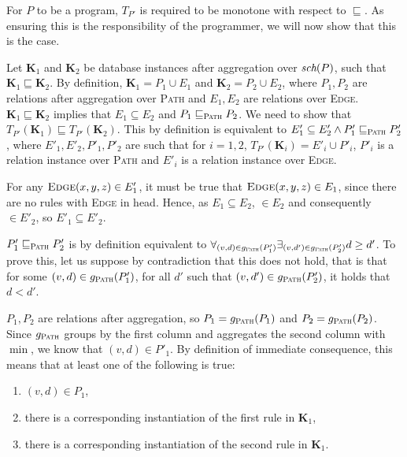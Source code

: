 \begin{exmp}
For $P$ to be a \datalogra program, $T_{P'}$ is required to be monotone with respect to $\sqsubseteq$. As ensuring this is the responsibility of the programmer, we will now show that this is the case.

\begin{prof}
Let \textbf{K}$_1$ and \textbf{K}$_2$ be database instances after aggregation over $\textit{sch}(P)$, such that $\textbf{K}_1 \sqsubseteq \textbf{K}_2$. By definition, $\textbf{K}_1 = P_1 \cup E_1$ and $\textbf{K}_2 = P_2 \cup E_2$, where $P_1, P_2$ are relations after aggregation over \textsc{Path} and $E_1, E_2$ are relations over \textsc{Edge}.  $\textbf{K}_1 \sqsubseteq \textbf{K}_2$ implies that $E_1 \subseteq E_2$ and $P_1 \sqsubseteq_\textsc{Path} P_2$. We need to show that $T_{P'}(\textbf{K}_1) \sqsubseteq T_{P'}(\textbf{K}_2)$. This by definition is equivalent to $E'_1 \subseteq E'_2 \wedge P'_1 \sqsubseteq_\textsc{Path} P'_2$, where $E'_1, E'_2, P'_1, P'_2$ are such that for $i = 1, 2$, $T_{P'}(\textbf{K}_i) = E'_i \cup P'_i$, $P'_i$ is a relation instance over \textsc{Path} and $E'_i$ is a relation instance over \textsc{Edge}.

For any $\textsc{Edge}{(x, y, z)} \in E'_1$, it must be true that $\textsc{Edge}{(x, y, z)} \in E_1$, since there are no rules with \textsc{Edge} in head. Hence, as $E_1 \subseteq E_2$, $ \in E_2$ and consequently $ \in E'_2$, so $E'_1 \subseteq E'_2$.

$P'_1 \sqsubseteq_\textsc{Path} P'_2$ is by definition equivalent to $\forall_{(v, d) \in g_\textsc{Path}(P'_1)} \exists_{(v, d') \in g_\textsc{Path}(P'_2)} d \ge d' $.  To prove this, let us suppose by contradiction that this does not hold, that is that for some $(v, d) \in g_\textsc{Path}(P'_1)$, for all $d'$ such that $(v, d') \in g_\textsc{Path}(P'_2)$, it holds that $d < d'$.

$P_1, P_2$ are relations after aggregation, so $P_1 = g_\textsc{Path}(P_1)$ and $P_2 = g_\textsc{Path}(P_2)$. Since $g_\textsc{Path}$ groups by the first column and aggregates the second column with $\min$, we know that $(v, d) \in P'_1$. By definition of immediate consequence, this means that at least one of the following is true:
\begin{enumerate}
\item $(v, d) \in P_1$,
\item there is a corresponding instantiation of the first rule in $\textbf{K}_1$,
\item there is a corresponding instantiation of the second rule in $\textbf{K}_1$.
\end{enumerate}


\end{prof}
\end{exmp}
